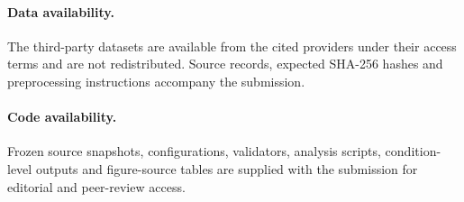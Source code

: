 \documentclass[smallextended]{svjour3}
\begin{document}
\paragraph{Data availability.} The third-party datasets are available from the cited providers under their access terms and are not redistributed. Source records, expected SHA-256 hashes and preprocessing instructions accompany the submission.
\paragraph{Code availability.} Frozen source snapshots, configurations, validators, analysis scripts, condition-level outputs and figure-source tables are supplied with the submission for editorial and peer-review access.

\end{document}
